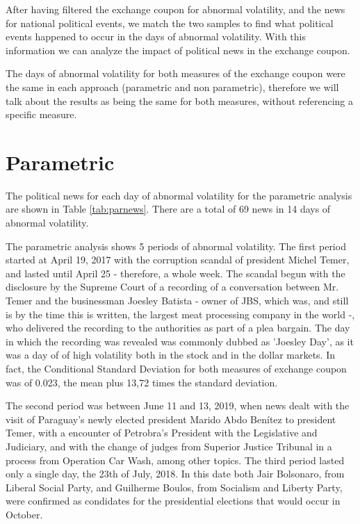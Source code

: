 \documentclass[cic,tc, english]{iiufrgs}
\begin{document}
    After having filtered the exchange coupon for abnormal volatility, and the news for national political events, we match the two samples to find what political events happened to occur in the days of abnormal volatility. With this information we can analyze the impact of political news in the exchange coupon.

    The days of abnormal volatility for both measures of the exchange coupon were the same in each approach (parametric and non parametric), therefore we will talk about the results as being the same for both measures, without referencing a specific measure.

\section{Parametric}

    The political news for each day of abnormal volatility for the parametric analysis are shown in Table \ref{tab:parnews}. There are a total of 69 news in 14 days of abnormal volatility.

    

    The parametric analysis shows 5 periods of abnormal volatility. The first period started at April 19, 2017 with the corruption scandal of president Michel Temer, and lasted until April 25 - therefore, a whole week. The scandal begun with the disclosure by the Supreme Court of a recording of a conversation between Mr. Temer and the businessman Joesley Batista - owner of JBS, which was, and still is by the time this is written, the largest meat processing company in the world -, who delivered the recording to the authorities as part of a plea bargain. The day in which the recording was revealed was commonly dubbed as 'Joesley Day', as it was a day of of high volatility both in the stock and in the dollar markets. In fact, the Conditional Standard Deviation for both measures of exchange coupon was of 0.023, the mean plus 13,72 times the standard deviation.

    The second period was between June 11 and 13, 2019, when news dealt with the visit of Paraguay's newly elected president Marido Abdo Benítez to president Temer, with a encounter of Petrobra's President with the Legislative and Judiciary, and with the change of judges from Superior Justice Tribunal in a process from Operation Car Wash, among other topics. The third period lasted only a single day, the 23th of July, 2018. In this date both Jair Bolsonaro, from Liberal Social Party, and Guilherme Boulos, from Socialism and Liberty Party, were confirmed as condidates for the presidential elections that would occur in October.
\end{document}
